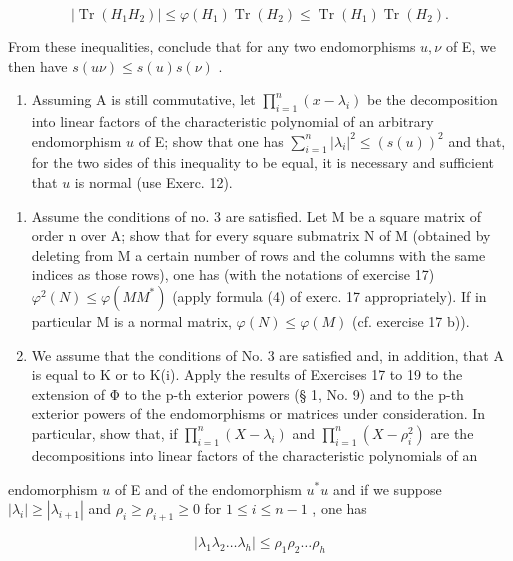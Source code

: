 \[
\left| \operatorname{Tr} (H _ {1} H _ {2}) \right| \leqslant \varphi (H _ {1}) \operatorname{Tr} (H _ {2}) \leqslant \operatorname{Tr} (H _ {1}) \operatorname{Tr} (H _ {2}).
\]

From these inequalities, conclude that for any two endomorphisms \(u, \nu\) of E, we then have \(s(u\nu) \leqslant s(u)s(\nu)\) .

\begin{enumerate}
\def\labelenumi{\alph{enumi})}
\setcounter{enumi}{2}
\tightlist
\item
  Assuming A is still commutative, let \(\prod_{i=1}^{n}(x-\lambda_i)\) be the decomposition into linear factors of the characteristic polynomial of an arbitrary endomorphism \(u\) of E; show that one has \(\sum_{i=1}^{n}|\lambda_i|^2\leqslant(s(u))^2\) and that, for the two sides of this inequality to be equal, it is necessary and sufficient that \(u\) is normal (use Exerc. 12).
\end{enumerate}

\begin{enumerate}
\def\labelenumi{\arabic{enumi})}
\setcounter{enumi}{18}
\item
  Assume the conditions of no. 3 are satisfied. Let M be a square matrix of order n over A; show that for every square submatrix N of M (obtained by deleting from M a certain number of rows and the columns with the same indices as those rows), one has (with the notations of exercise 17) \(\varphi^{2}(N) \leqslant \varphi(MM^{*})\) (apply formula (4) of exerc. 17 appropriately). If in particular M is a normal matrix, \(\varphi(N) \leqslant \varphi(M)\) (cf. exercise 17 b)).
\item
  We assume that the conditions of No. 3 are satisfied and, in addition, that A is equal to K or to K(i). Apply the results of Exercises 17 to 19 to the extension of Φ to the p-th exterior powers (§ 1, No. 9) and to the p-th exterior powers of the endomorphisms or matrices under consideration. In particular, show that, if \(\prod_{i=1}^{n}(X-\lambda_i)\) and \(\prod_{i=1}^{n}(X-\rho_i^2)\) are the decompositions into linear factors of the characteristic polynomials of an
\end{enumerate}

endomorphism \(u\) of E and of the endomorphism \(u^*u\) and if we suppose \(|\lambda_i| \geqslant |\lambda_{i+1}|\) and \(\rho_i \geqslant \rho_{i+1} \geqslant 0\) for \(1 \leqslant i \leqslant n-1\) , one has

\[
\mid \lambda_ {1} \lambda_ {2} \dots \lambda_ {h} \mid \leqslant \rho_ {1} \rho_ {2} \dots \rho_ {h}
\]

